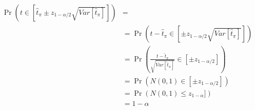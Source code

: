 \documentclass{article}
\begin{document}
    \begin{align}
      \Pr\left(t\in \left[\widehat{t}_\pi \pm z_{1-\alpha/2}\sqrt{Var[\widehat{t}_\pi]}\right]\right) &=\\
      &= \Pr\left(t - \widehat{t}_\pi \in \left[\pm z_{1-\alpha/2}\sqrt{Var[\widehat{t}_\pi]}\right]\right) \\
      &= \Pr\left(\frac{t - \widehat{t}_\pi}{\sqrt{Var[\widehat{t}_\pi]}} \in \left[\pm z_{1-\alpha/2}\right]\right)  \\
      &= \Pr\left(N(0,1) \in [\pm z_{1-\alpha/2}]\right) \\
      &= \Pr\left(N(0,1) \leq z_{1-\alpha}]\right) \\
      &=  1- \alpha
    \end{align}
	\nocite{muest2017}
  \nocite{sarndal2003model}

  
  
\end{document}
